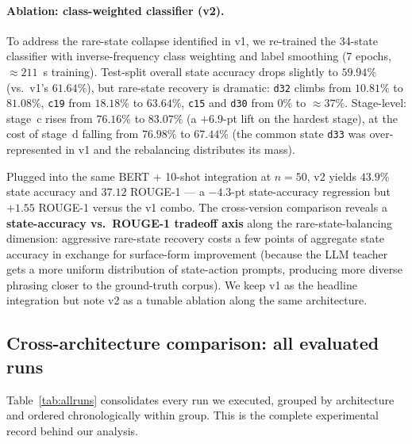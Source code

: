 \documentclass[11pt]{article}
\begin{document}
\paragraph{Ablation: class-weighted classifier (v2).} To address the rare-state collapse identified in v1, we re-trained the 34-state classifier with inverse-frequency class weighting and label smoothing (7 epochs, $\approx 211$~s training). Test-split overall state accuracy drops slightly to $59.94\%$ (vs.\ v1's $61.64\%$), but rare-state recovery is dramatic: \texttt{d32} climbs from $10.81\%$ to $81.08\%$, \texttt{c19} from $18.18\%$ to $63.64\%$, \texttt{c15} and \texttt{d30} from $0\%$ to $\approx 37\%$. Stage-level: stage~c rises from $76.16\%$ to $\mathbf{83.07\%}$ (a $+6.9$-pt lift on the hardest stage), at the cost of stage~d falling from $76.98\%$ to $67.44\%$ (the common state \texttt{d33} was over-represented in v1 and the rebalancing distributes its mass).

Plugged into the same BERT + 10-shot integration at $n{=}50$, v2 yields $43.9\%$ state accuracy and $\mathbf{37.12}$ ROUGE-1 --- a $-4.3$-pt state-accuracy regression but $+1.55$ ROUGE-1 versus the v1 combo. The cross-version comparison reveals a \textbf{state-accuracy vs.\ ROUGE-1 tradeoff axis} along the rare-state-balancing dimension: aggressive rare-state recovery costs a few points of aggregate state accuracy in exchange for surface-form improvement (because the LLM teacher gets a more uniform distribution of state-action prompts, producing more diverse phrasing closer to the ground-truth corpus). We keep v1 as the headline integration but note v2 as a tunable ablation along the same architecture.

\subsection{Cross-architecture comparison: all evaluated runs}
\label{sec:allruns}

Table~\ref{tab:allruns} consolidates every run we executed, grouped by architecture and ordered chronologically within group. This is the complete experimental record behind our analysis.
\end{document}
